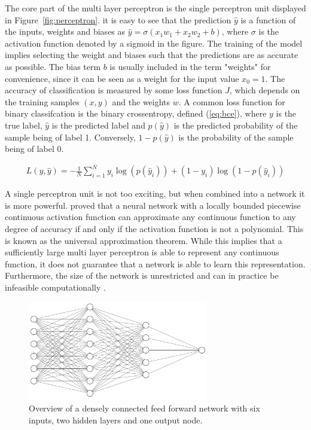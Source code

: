 The core part of the multi layer perceptron is the single perceptron unit displayed in Figure~\ref{fig:perceptron}. it is easy to see that the prediction $\hat{y}$ is a function of the inputs, weights and biases as $\hat{y} = \sigma(x_1 w_1 + x_2 w_2 + b)$, where $\sigma$ is the activation function denoted by a sigmoid in the figure. The training of the model implies selecting the weight and biases such that the predictions are as accurate as possible. The bias term $b$ is usually included in the term "weights" for convenience, since it can be seen as a weight for the input value $x_0 = 1$. The accuracy of classification is measured by some loss function $J$, which depends on the training samples $(x,y)$ and the weights $w$.  A common loss function for binary classifcation is the binary crossentropy, defined (\ref{eq:bce}), where $y$ is the true label, $\hat{y}$ is the predicted label and $p(\hat{y})$ is the predicted probability of the sample being of label 1. Conversely, $1 - p(\hat{y})$ is the probability of the sample being of label 0. 

\begin{align}
    L(y,\hat{y}) = -\frac{1}{N} \sum_{i=1}^N y_i \log{(p(\hat{y}_i))} + (1 - y_i) \log{(1 - p(\hat{y}_i))} \label{eq:bce}
\end{align}

A single perceptron unit is not too exciting, but when combined into a network it is more powerful. \citet{leshno1993multilayer} proved that a neural network with a locally bounded piecewise continuous activation function can approximate any continuous function to any degree of accuracy if and only if the activation function is not a polynomial. This is known as the universal approximation theorem. While this implies that a sufficiently large multi layer perceptron is able to represent any continuous function, it does not guarantee that a network is able to learn this representation. Furthermore, the size of the network is unrestricted and can in practice be infeasible computationally \citep{Goodfellow-et-al-2016}. 


\begin{figure}[H]
    \centering
    \includegraphics[width=0.7\textwidth]{Figures/ff.PNG}
    \caption{Overview of a densely connected feed forward network with six inputs, two hidden layers and one output node.}
    \label{fig:mlp}
\end{figure}

